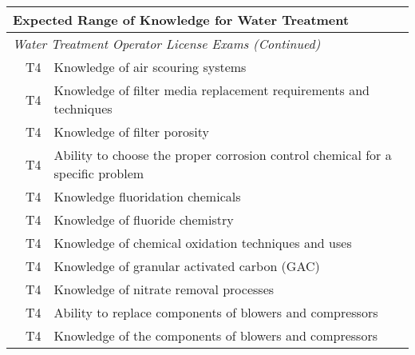 \begin{table}[H]
\begin{tabular}{| m{1cm} | m{1cm} | m{12cm} |}
\hline
\multicolumn{3}{|l|}{\textbf{Expected   Range of Knowledge for Water Treatment}}                                                                         \\ \hline
\multicolumn{3}{|l|}{\textit{Water   Treatment Operator License Exams (Continued)}}                                                                        \\ \hline
\multicolumn{1}{l|}{} & \multicolumn{1}{l|}{T4}    & Knowledge of air   scouring systems                                                        \\ \cline{2-3} 
\multicolumn{1}{l|}{} & \multicolumn{1}{l|}{T4}    & Knowledge of filter   media replacement requirements and techniques                        \\ \cline{2-3} 
\multicolumn{1}{l|}{} & \multicolumn{1}{l|}{T4}    & Knowledge of filter   porosity                                                             \\ \cline{2-3} 
\multicolumn{1}{l|}{} & \multicolumn{1}{l|}{T4}    & Ability to choose the   proper corrosion control chemical for a specific problem           \\ \cline{2-3} 
\multicolumn{1}{l|}{} & \multicolumn{1}{l|}{T4}    & Knowledge   fluoridation chemicals                                                         \\ \cline{2-3} 
\multicolumn{1}{l|}{} & \multicolumn{1}{l|}{T4}    & Knowledge of fluoride   chemistry                                                          \\ \cline{2-3} 
\multicolumn{1}{l|}{} & \multicolumn{1}{l|}{T4}    & Knowledge of chemical   oxidation techniques and uses                                      \\ \cline{2-3} 
\multicolumn{1}{l|}{} & \multicolumn{1}{l|}{T4}    & Knowledge of granular   activated carbon (GAC)                                             \\ \cline{2-3} 
\multicolumn{1}{l|}{} & \multicolumn{1}{l|}{T4}    & Knowledge of nitrate   removal processes                                                   \\ \cline{2-3} 
\multicolumn{1}{l|}{} & \multicolumn{1}{l|}{T4}    & Ability to replace   components of blowers and compressors                                 \\ \cline{2-3} 
\multicolumn{1}{l|}{} & \multicolumn{1}{l|}{T4}    & Knowledge of the   components of blowers and compressors                                   \\ \cline{2-3} 
\end{tabular}
\end{table}
\newpage





